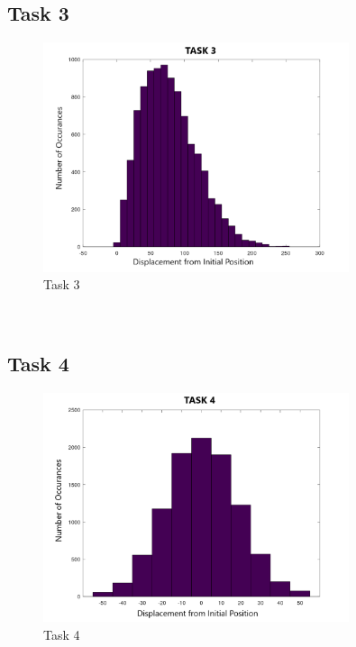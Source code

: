 \documentclass[answers]{exam}
\begin{document}
\subsection{Task 3}
\begin{figure}[H]
        \centering
        \includegraphics[width = 0.8\textwidth]{Graphs/task3.png}
        \caption{Task 3}
        \label{fig:task3}
    \end{figure}\\
    
\subsection{Task 4}
    \begin{figure}[H]
        \centering
        \includegraphics[width = 0.8\textwidth]{Graphs/task4.png}
        \caption{Task 4}
        \label{fig:task4}
    \end{figure}\\
    
\end{document}
